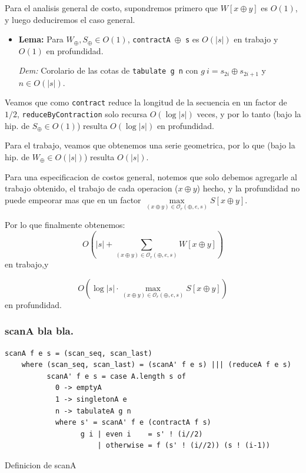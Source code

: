 \documentclass[12pt]{article}
\begin{document}
Para el analisis general de costo, supondremos primero que $W[x \oplus y]$ es $O(1)$, y luego deduciremos el caso general.

\begin{itemize}
\item \textbf{Lema:} Para $W_\oplus,S_\oplus \in O(1)$, \texttt{contractA $\oplus$ s} es $O(|s|)$ en trabajo y $O(1)$ en profundidad.

 \textit{Dem:} Corolario de las cotas de \texttt{tabulate g n} con $g\ i = s_{2i}\oplus s_{2i+1}$ y $n\in O(|s|)$.
\end{itemize}

Veamos que como \texttt{contract} reduce la longitud de la secuencia en un factor de $1/2$, \texttt{reduceByContraction} solo recursa $O(\log |s|)$ veces, y por lo tanto (bajo la hip. de $S_\oplus \in O(1)$) resulta $O(\log |s|)$ en profundidad.

Para el trabajo, veamos que obtenemos una serie geometrica, por lo que (bajo la hip. de $W_\oplus \in O(|s|)$) resulta $O(|s|)$.

Para una especificacion de costos general, notemos que solo debemos agregarle al trabajo obtenido, el trabajo de cada operacion ($x\oplus y$) hecho, y la profundidad no puede empeorar mas que en un factor $\max\limits_{(x\oplus y)\in\mathcal{O}_r(\oplus,e,s)} S[x\oplus y]$.

Por lo que finalmente obtenemos:
$$O(|s| + \sum\limits_{(x\oplus y)\in\mathcal{O}_r(\oplus,e,s)} W[x\oplus y])$$ en trabajo,y

$$ O(\log |s|\cdot \max\limits_{(x\oplus y)\in\mathcal{O}_r(\oplus,e,s)} S[x\oplus y])$$ en profundidad.

\subsubsection{scanA bla bla.}

\begin{table}[h]
\begin{lstlisting}
scanA f e s = (scan_seq, scan_last)
    where (scan_seq, scan_last) = (scanA' f e s) ||| (reduceA f e s)
          scanA' f e s = case A.length s of
            0 -> emptyA
            1 -> singletonA e
            n -> tabulateA g n
            where s' = scanA' f e (contractA f s)
                  g i | even i    = s' ! (i//2)
                      | otherwise = f (s' ! (i//2)) (s ! (i-1))
\end{lstlisting}
\caption{Definicion de scanA}
\end{table}
\end{document}
